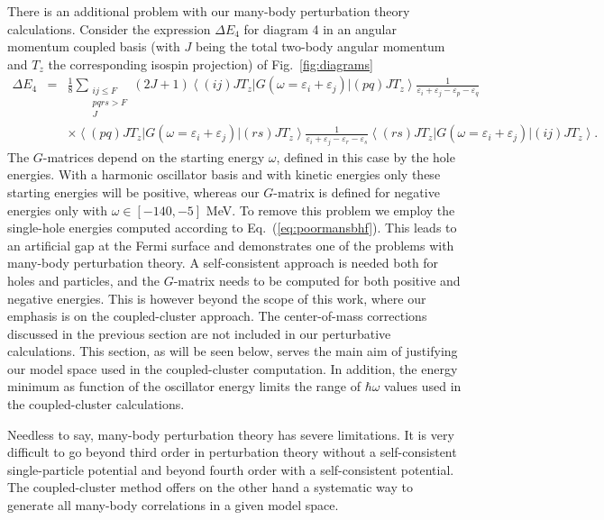 There is an additional problem with our 
many-body perturbation theory calculations. Consider the expression $\Delta E_4$
for diagram 4 in an angular momentum coupled basis (with  $J$ being the total two-body angular
momentum and $T_z$ the corresponding isospin projection)
of Fig.~\ref{fig:diagrams}
\begin{eqnarray}
\Delta E_4 &=& \frac{1}{8}\sum_{\begin{array}{c}ij\leq F\\ pqrs > F\\ J\end{array}}(2J+1)
\left\langle (ij)JT_z\right | G(\omega=\varepsilon_i+\varepsilon_j) \left | (pq)JT_z 
\right\rangle\frac{1}{\varepsilon_i+\varepsilon_j-\varepsilon_p-\varepsilon_q} \\ \nonumber 
&& \times \left\langle (pq)JT_z\right | G(\omega=\varepsilon_i+\varepsilon_j) \left | (rs)JT_z
\right\rangle\frac{1}{\varepsilon_i+\varepsilon_j-\varepsilon_r-\varepsilon_s}
\left\langle (rs)JT_z\right | G(\omega=\varepsilon_i+\varepsilon_j) \left | (ij)JT_z
\right\rangle.
\end{eqnarray}
The $G$-matrices depend on the starting energy $\omega$, defined 
in this case by the hole energies.
With a harmonic oscillator basis and with kinetic energies only 
these starting energies will be positive, whereas
our $G$-matrix is defined for negative energies only with  $\omega \in [-140,-5]$ MeV.
To remove this problem we employ the  single-hole energies computed
according to Eq.~(\ref{eq:poormansbhf}). This leads to an artificial gap at the Fermi surface
and demonstrates one of the problems with many-body perturbation theory. A self-consistent 
approach is needed both for holes and particles, and the $G$-matrix needs to be 
computed for both
positive and negative energies. This is however beyond the scope of this work, where our
emphasis is on the coupled-cluster approach.  The center-of-mass corrections discussed in the previous
section are not included in our perturbative calculations.
This section, as will be seen below, serves the main aim
of justifying our model space used in the coupled-cluster computation. 
In addition, the energy minimum as function of the oscillator energy limits the range
of $\hbar\omega$ values used in the coupled-cluster calculations. 
 
Needless to say, many-body perturbation theory 
has severe limitations. It is very difficult to go beyond third order
in perturbation theory 
without a self-consistent single-particle potential and beyond 
fourth order with a self-consistent potential.  
The coupled-cluster method offers on the other hand a systematic way to generate all
many-body correlations in a given model space. 

